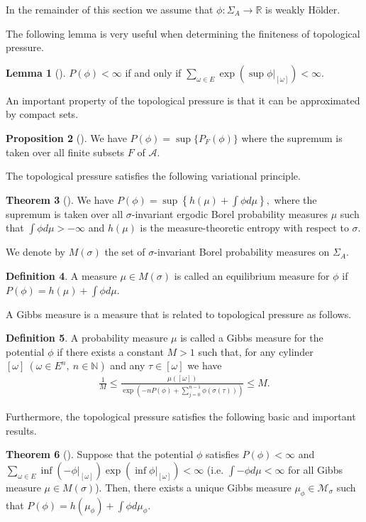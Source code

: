 \documentclass{article}
\theoremstyle{definition}
\newtheorem{thm}{Theorem}[section]
\newtheorem{prop}[thm]{Proposition}
\newtheorem{lemma}[thm]{Lemma}
\newtheorem{definition}[thm]{Definition}
\begin{document}
In the remainder of this section we assume that $\phi:\Sigma_A\rightarrow\mathbb{R}$ is weakly H\"older. 

The following lemma is very useful when determining the finiteness of topological pressure.
\begin{lemma}[{\cite[Proposition 2.1.9]{mauldin2003graph}}]\label{original convergence lemma}
$P(\phi)<\infty$ if and only if $\sum_{\omega\in E}\exp(\sup\phi|_{[\omega]})<\infty$. 
\end{lemma}
An important property of the topological pressure is that it can be approximated by compact sets.
\begin{prop}[{\cite[Theorem 2.1.5]{mauldin2003graph}}]\label{approximation property}
    We have
        $P(\phi)=\sup\lbrace P_F(\phi)\rbrace\nonumber$
    where the supremum is taken over all finite subsets $F$ of $\mathcal{A}$.
\end{prop}
The topological pressure satisfies the following variational principle.
\begin{thm}[{\cite[Theorem 2.1.8]{mauldin2003graph}}]
We have 
    $P(\phi)=\sup \left\{h(\mu)+\int \phi d\mu \right\},\nonumber$
    where the supremum is taken over all $\sigma$-invariant ergodic Borel probability measures $\mu$ such that $\int \phi d\mu>-\infty$ and $h(\mu)$ is the measure-theoretic entropy with respect to $\sigma$.
\end{thm}
We denote by $M(\sigma)$ the set of $\sigma$-invariant Borel probability measures on $\Sigma_A$. 
\begin{definition}
    A measure $\mu \in {M}(\sigma)$ is called an equilibrium measure for $\phi$ if 
         $P(\phi)= h(\mu)+\int \phi d\mu\nonumber.$
\end{definition}
A Gibbs measure is a measure that is related to topological pressure as follows.
\begin{definition}
    A probability measure $\mu$ is called a Gibbs measure for the potential $\phi$ if there exists a constant $M>1$ such that, for any cylinder $[\omega]\ (\omega \in E^n,\ n\in\mathbb{N})$ and any $\tau\in [\omega]$ we have 
    \begin{align}
        \frac{1}{M}\leq\frac{\mu([\omega])}{\exp(-nP(\phi)+\sum_{j=0}^{n-1}\phi(\sigma(\tau)))}\leq M\nonumber.
    \end{align}
\end{definition}
Furthermore, the topological pressure satisfies the following basic and important results.
\begin{thm}[{\cite[Theorem 2.2.9]{mauldin2003graph}}]
 Suppose that the potential $\phi$ satisfies $P(\phi)<\infty$ and\\
     $\sum_{\omega\in E}\inf(-\phi|_{[\omega]})\exp(\inf\phi|_{[\omega]})<\infty\nonumber$
 (i.e. $\int -\phi d\mu<\infty$ for all Gibbs measure $\mu\in {M}(\sigma)$). Then, there exists a unique Gibbs measure $\mu_\phi \in\mathcal{M}_\sigma$ such that 
      $P(\phi)= h(\mu_{\phi})+\int \phi d\mu_\phi.$
 \end{thm}
\end{document}
